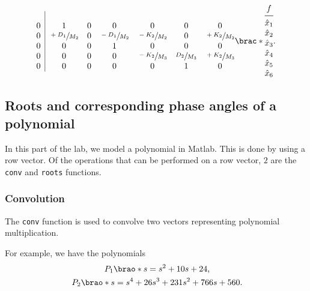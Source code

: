 \documentclass[12pt]{article}
\DeclarePairedDelimiter\brao()%
\DeclarePairedDelimiter\brac[]%
\begin{document}
\begin{equation}
\begin{array}{*4{@{}c}@{}}
{\begin{array}{@{}c|*6c@{}}
            \\*
                0 & 1 & 0 & 0 & 0 & 0 & 0
            \\*
                0 & \sfrac{+D_1}{M_2} & 0 & \sfrac{-D_1}{M_2} & \sfrac{-K_2}{M_2} & 0 & \sfrac{+K_2}{M_2}
            \\*
                0 & 0 & 0 & 1 & 0 & 0 & 0
            \\*
                0 & 0 & 0 & 0 & \sfrac{-K_2}{M_3} &  \sfrac{D_2}{M_3} & \sfrac{+K_2}{M_3}
            \\*
                0 & 0 & 0 & 0 & 0 & 1 & 0
            \\*
            \end{array}
        }
        &
        \brac*{
            \begin{array}{@{}c@{}}
                f \\*
            \midrule
                {\hat{x}}_1 \\* {\hat{x}}_2 \\*
                {\hat{x}}_3 \\* {\hat{x}}_4 \\*
                {\hat{x}}_5 \\* {\hat{x}}_6 \\*
            \end{array}
        }.
    \end{array}
\end{equation}

\subsection{Roots and corresponding phase angles of a polynomial}

In this part of the lab, we model a polynomial in Matlab.
This is done by using a row vector.
Of the operations that can be performed on a row vector, $2$ are the \texttt{conv} and \texttt{roots} functions.

\subsubsection{Convolution}\label{sss:conv}

The \texttt{conv} function is used to convolve two vectors representing polynomial multiplication.

For example, we have the polynomials
\[
    \begin{gathered}
        P_1\brao*s = s^2 + 10s + 24\rlap, \\*
        P_2\brao*s = s^4 + 26s^3 + 231s^2 + 766s + 560\rlap. \\*
    \end{gathered}
\]
\end{document}

